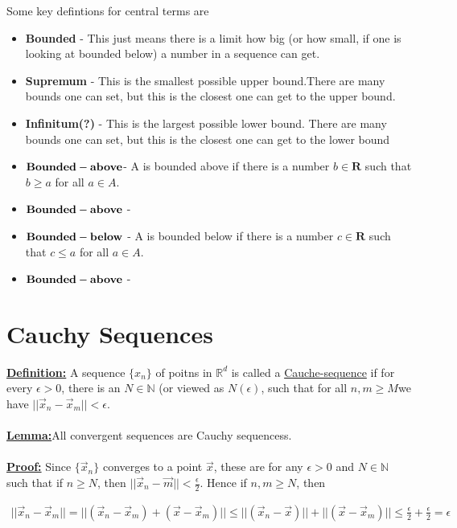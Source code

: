 \documentclass[12pt,letterpaper]{article}
\begin{document}
Some key defintions for central terms are 
\begin{itemize}
	\item \textbf{Bounded} - This just means there is a limit how big (or how small, if one is looking at bounded below) a number in a sequence can get. 
	\item \textbf{Supremum} - This is the smallest possible upper bound.There are many bounds one can set, but this is the closest one can get to the upper bound. 
	\item \textbf{Infinitum(?)} - This is the largest possible lower bound. There are many bounds one can set, but this is the closest one can get to the lower bound
	\item $\bold{Bounded-above}$- A is bounded above if there is a number $b\in\mathbf{R}$ such that $b\ge a$ for all $a\in A$.
	\item $\bold{Bounded-above}$ - 
	\item $\bold{Bounded-below}$ - A is bounded below if there is a number $c\in\mathbf{R}$ such that $c\le a$ for all $a\in A$.
	\item $\bold{Bounded-above}$ - 
\end{itemize}








\section*{Cauchy Sequences}
\uline{\textbf{Definition:}} A sequence $\{x_n\}$ of poitns in $\mathbb{R}^d$ is called a \uline{Cauche-sequence} if for every $\epsilon>0$, there is an $N\in\mathbb{N}$ (or viewed as $N(\epsilon)$, such that for all $n,m\ge M$we have  $||\vec{x}_n-\vec{x}_m||<\epsilon$.\\
\\
\uline{\textbf{Lemma:}}All convergent sequences are Cauchy sequencess. \\
\\
\uline{\textbf{Proof:}} Since $\{\vec{x}_n\}$ converges to a point $\vec{x}$, these are for any $\epsilon >0$ and $N\in\mathbb{N}$ such that if $n\ge N$, then $||\vec{x}_n-\vec{m}||<\frac{\epsilon}{2}$. Hence if  $n,m \ge N$, then 

\begin{align*}
	||\vec{x}_n-\vec{x}_m|| = ||(\vec{x}_n- \vec{x}_m) + ( \vec{x}- \vec{x}_m)|| \le ||(\vec{x}_n- \vec{x})|| + ||( \vec{x}- \vec{x}_m)|| \le \frac{\epsilon}{2}+\frac{\epsilon}{2} = \epsilon \\
\end{align*}
\end{document}
